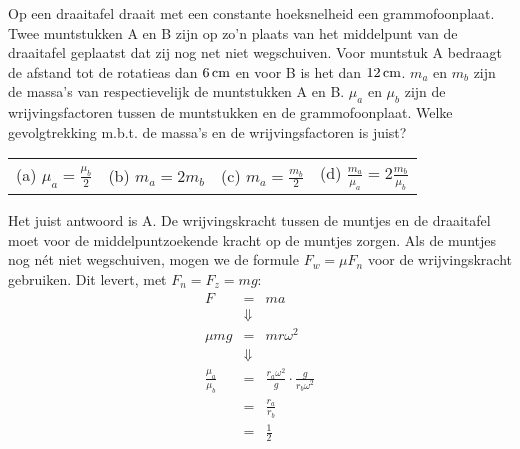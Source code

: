 \documentclass{ximera}
\begin{document}
\begin{exercise} Op een draaitafel draait met een constante hoeksnelheid een grammofoonplaat. Twee muntstukken A en B zijn op zo'n plaats van het middelpunt van de draaitafel geplaatst dat zij nog net niet wegschuiven. Voor muntstuk A bedraagt de afstand tot de rotatieas dan $6\rm\,cm$ en voor B is het dan $12\rm\,cm$. $m_a$ en $m_b$ zijn de massa's van respectievelijk de muntstukken A en B. $\mu_a$ en $\mu_b$ zijn de wrijvingsfactoren tussen de muntstukken en de grammofoonplaat.
\newline
Welke gevolgtrekking m.b.t. de massa's en de wrijvingsfactoren is juist?
\newline
\newline
\begin{tabularx}{\textwidth}{*4{X}}
(a) $\displaystyle\mu_a=\frac{\mu_b}{2}$ & (b) $\displaystyle m_a=2m_b$ & (c) $\displaystyle m_a=\frac{m_b}{2}$ & (d)	$\displaystyle\frac{m_a}{\mu_a}=2\frac{m_b}{\mu_b}$
\end{tabularx}
\begin{oplossing}
Het juist antwoord is A. De wrijvingskracht tussen de muntjes en de
draaitafel moet voor de middelpuntzoekende kracht op de muntjes
zorgen. Als de muntjes nog n\'et niet wegschuiven, mogen we de
formule $F_w=\mu F_n$ voor de wrij\-vings\-kracht gebruiken. Dit
levert, met $F_n=F_z=mg$:
\begin{eqnarray*}
F&=&ma\\
&\Downarrow&\\
\mu mg&=&mr\omega^2\\
&\Downarrow&\\
\frac{\mu_a}{\mu_b}&=&\frac{r_a\omega^2}{g}\cdot\frac{g}{r_b\omega^2}\\
&=&\frac{r_a}{r_b}\\
&=&\frac{1}{2}
\end{eqnarray*}
\end{oplossing}

\end{exercise}
\end{document}
